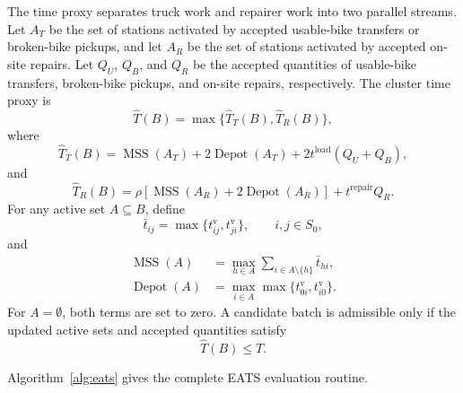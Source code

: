 The time proxy separates truck work and repairer work into two parallel streams.
Let $A_T$ be the set of stations activated by accepted usable-bike transfers or
broken-bike pickups, and let $A_R$ be the set of stations activated by accepted
on-site repairs. Let $Q_U$, $Q_B$, and $Q_R$ be the accepted quantities of
usable-bike transfers, broken-bike pickups, and on-site repairs, respectively.
The cluster time proxy is
\begin{equation}
\widehat T(B)=\max\{\widehat T_T(B),\widehat T_R(B)\},
\label{eq:eats-cluster-time}
\end{equation}
where
\begin{equation}
\widehat T_T(B)
=\operatorname{MSS}(A_T)
+2\operatorname{Depot}(A_T)
+2t^{\mathrm{load}}(Q_U+Q_B),
\label{eq:eats-truck-time}
\end{equation}
and
\begin{equation}
\widehat T_R(B)
=\rho\left[
\operatorname{MSS}(A_R)+2\operatorname{Depot}(A_R)
\right]
+t^{\mathrm{repair}}Q_R.
\label{eq:eats-repairer-time}
\end{equation}
For any active set $A\subseteq B$, define
\begin{equation}
\bar t_{ij}=\max\{t_{ij}^{\mathrm v},t_{ji}^{\mathrm v}\},
\qquad i,j\in S_0,
\label{eq:eats-symmetric-time}
\end{equation}
and
\begin{align}
\operatorname{MSS}(A)
&=\max_{h\in A}\sum_{i\in A\setminus\{h\}}\bar t_{hi},
\label{eq:eats-mss}\\
\operatorname{Depot}(A)
&=\max_{i\in A}\max\{t_{0i}^{\mathrm v},t_{i0}^{\mathrm v}\}.
\label{eq:eats-depot-bound}
\end{align}
For $A=\emptyset$, both terms are set to zero. A candidate batch is admissible
only if the updated active sets and accepted quantities satisfy
\begin{equation}
\widehat T(B)\le T.
\label{eq:eats-time-budget}
\end{equation}

Algorithm~\ref{alg:eats} gives the complete EATS evaluation routine.

